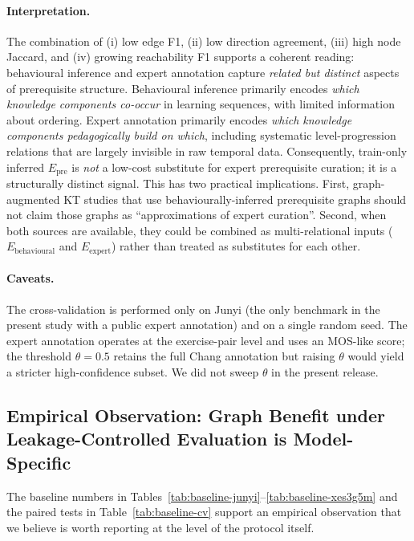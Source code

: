 \documentclass[runningheads]{llncs}
\newcommand{\Epre}{\ensuremath{E_{\text{pre}}}}
\newcommand{\KCs}{knowledge components}
\begin{document}
\paragraph{Interpretation.}
The combination of (i) low edge F1, (ii) low direction agreement,
(iii) high node Jaccard, and (iv) growing reachability F1 supports a
coherent reading: behavioural inference and expert annotation capture
\emph{related but distinct} aspects of prerequisite structure.
Behavioural inference primarily encodes \emph{which \KCs{} co-occur}
in learning sequences, with limited information about ordering.
Expert annotation primarily encodes \emph{which \KCs{} pedagogically
build on which}, including systematic level-progression relations
that are largely invisible in raw temporal data.
Consequently, train-only inferred $\Epre$ is \emph{not} a low-cost
substitute for expert prerequisite curation; it is a structurally
distinct signal. This has two practical implications. First,
graph-augmented KT studies that use behaviourally-inferred prerequisite
graphs should not claim those graphs as ``approximations of expert
curation''. Second, when both sources are available, they could be
combined as multi-relational inputs ($E_{\text{behavioural}}$ and
$E_{\text{expert}}$) rather than treated as substitutes for each other.

\paragraph{Caveats.}
The cross-validation is performed only on Junyi (the only benchmark
in the present study with a public expert annotation) and on a single
random seed. The expert annotation operates at the exercise-pair level
and uses an MOS-like score; the threshold $\theta=0.5$ retains the
full Chang annotation but raising $\theta$ would yield a stricter
high-confidence subset. We did not sweep $\theta$ in the present
release.
\subsection{Empirical Observation: Graph Benefit under
Leakage-Controlled Evaluation is Model-Specific}
\label{sec:exp-fextra}
The baseline numbers in Tables~\ref{tab:baseline-junyi}--\ref{tab:baseline-xes3g5m}
and the paired tests in Table~\ref{tab:baseline-cv} support an empirical observation
that we believe is worth reporting at the level of the protocol itself.
\end{document}
